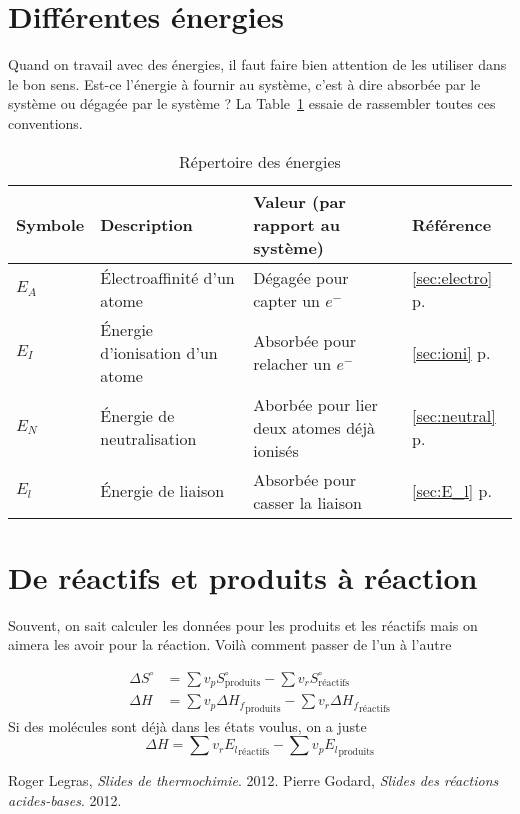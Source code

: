 \begin{appendices}
\section{Différentes énergies}

Quand on travail avec des énergies, il faut faire bien attention de les utiliser dans le bon sens.
Est-ce l'énergie à fournir au système, c'est à dire absorbée par le système ou dégagée par le système ?
La Table~\ref{tab:energies} essaie de rassembler toutes ces conventions.

\begin{table}[h!]
	\begin{center}
		\begin{tabular}{|p{}|p{}|p{}|p{}|}
			\hline
			Symbole & Description & Valeur (par rapport au système) & Référence\\
			\hline
			$E_A$ & \'Electroaffinité d'un atome & Dégagée pour capter un $e^-$ & \ref{sec:electro} p.~\pageref{sec:electro}\\
			$E_I$ & \'Energie d'ionisation d'un atome & Absorbée pour relacher un $e^-$ & \ref{sec:ioni} p.~\pageref{sec:ioni}\\
			$E_N$ & \'Energie de neutralisation & Aborbée pour lier deux atomes déjà ionisés & \ref{sec:neutral} p.~\pageref{sec:neutral}\\
			$E_l$ & \'Energie de liaison & Absorbée pour casser la liaison & \ref{sec:E_l} p.~\pageref{sec:E_l}\\ %
			\hline
		\end{tabular}
		\caption{Répertoire des énergies}
		\label{tab:energies}
	\end{center}
\end{table}

\section{De réactifs et produits à réaction}
Souvent, on sait calculer les données pour les produits et les réactifs mais on aimera les avoir pour la réaction.
Voilà comment passer de l'un à l'autre

\begin{align*}
	\Delta S^{\circ} &= \sum v_p S^{\circ}_\mathrm{produits} - \sum v_r S^{\circ}_\mathrm{réactifs}\\
	\Delta H &= \sum v_p \Delta {H_f}_\mathrm{produits} - \sum v_r \Delta {H_f}_\mathrm{réactifs}
\end{align*}
Si des molécules sont déjà dans les états voulus, on a juste
\[ \Delta H = \sum v_r{E_l}_\mathrm{réactifs} - \sum v_p{E_l}_\mathrm{produits} \]

\end{appendices}

\begin{thebibliography}{9}
		Roger Legras,
		\emph{Slides de thermochimie}.
		2012.
		Pierre Godard,
		\emph{Slides des réactions acides-bases}.
		2012.
\end{thebibliography}

